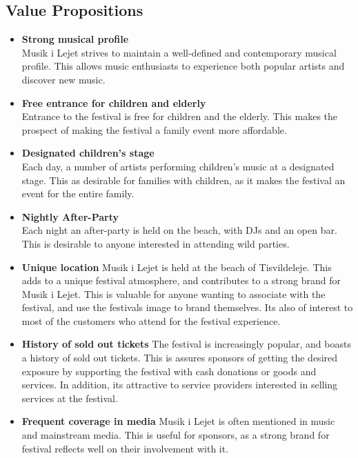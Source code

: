 \subsection{Value Propositions} %
\label{sub:value_propositions}
\begin{itemize}
	\item \textbf{Strong musical profile}\\
	 Musik i Lejet strives to maintain a well-defined and contemporary musical profile. This allows music enthusiasts to experience both popular artists and discover new music.
	\item \textbf{Free entrance for children and elderly}\\
	Entrance to the festival is free for children and the elderly. This makes the prospect of making the festival a family event more affordable.
	\item \textbf{Designated children's stage}\\
	Each day, a number of artists performing children's music at a designated stage. This as desirable for families with children, as it makes the festival an event for the entire family.
	\item \textbf{Nightly After-Party}\\
	Each night an after-party is held on the beach, with DJs and an open bar. This is desirable to anyone interested in attending wild parties.
	\item \textbf{Unique location}
	Musik i Lejet is held at the beach of Tisvildeleje. This adds to a unique festival atmosphere, and contributes to a strong brand for Musik i Lejet. This is valuable for anyone wanting to associate with the festival, and use the festivals image to brand themselves. Its also of interest to most of the customers who attend for the festival experience.
	\item \textbf{History of sold out tickets}
	The festival is increasingly popular, and boasts a history of sold out tickets. This is assures sponsors of getting the desired exposure by supporting the festival with cash donations or goods and services. In addition, its attractive to service providers interested in selling services at the festival.
	\item \textbf{Frequent coverage in media}
	Musik i Lejet is often mentioned in music and mainstream media. This is useful for sponsors, as a strong brand for festival reflects well on their involvement with it.
\end{itemize}
